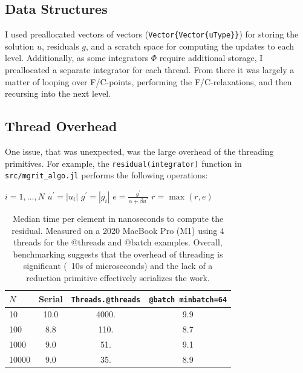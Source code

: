 \documentclass{article}
\begin{document}
\subsection{Data Structures}
I used preallocated vectors of vectors (\verb!Vector{Vector{uType}}!) for storing the solution \(u\), residuals \(g\), and a scratch space for computing the updates to each level.
Additionally, as some integrators \(\Phi\) require additional storage, I preallocated a separate integrator for each thread.
From there it was largely a matter of looping over F/C-points, performing the F/C-relaxations, and then recursing into the next level.

\subsection{Thread Overhead}\label{sec:thread_overhead}
One issue, that was unexpected, was the large overhead of the threading primitives.
For example, the \verb!residual(integrator)! function in \verb!src/mgrit_algo.jl! performs the following operations:

\begin{algorithm}[h!]
    \begin{algorithmic}
        \For \(i = 1, \dots, N\)
            \State \( u^\prime = |u_i| \)   
            \State \( g^\prime = |g_i| \)        
            \State \( e = \frac{g^\prime}{\alpha + \beta u^\prime} \) 
            \State \( r = \max(r, e) \) 
        \EndFor
    \end{algorithmic}
\end{algorithm}

\begin{table}[h!]
    \centering
    \begin{tabular}[t]{lccc}
        \(N\)   & Serial & \verb!Threads.@threads! & \verb!@batch minbatch=64! \\
        \midrule
        10      & 10.0 & 4000. & 9.9 \\
        100     & 8.8  & 110.  & 8.7 \\
        1000    & 9.0  & 51.   & 9.1 \\
        10000   & 9.0  & 35.   & 8.9 \\
        \bottomrule
    \end{tabular}
    \caption{Median time per element in nanoseconds to compute the residual. Measured on a 2020 MacBook Pro (M1) using 4 threads for the @threads and @batch examples. Overall, benchmarking suggests that the overhead of threading is significant (~10s of microseconds) and the lack of a reduction primitive effectively serializes the work.}
    \label{tab:bench_residual}
\end{table}
\end{document}
